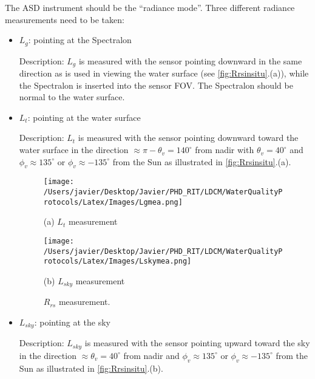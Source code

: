 \begin{appendices}
The ASD instrument should be the ``radiance mode''. Three different radiance measurements need to be taken:
\begin{itemize}[itemsep=2pt,parsep=2pt]
	\item $L_g$: pointing at the Spectralon

Description: $L_g$ is measured with the sensor pointing downward in the same direction as is used in viewing the water surface (see \autoref{fig:Rrsinsitu}.(a)), while the Spectralon is inserted into the sensor FOV. The Spectralon should be normal to the water surface.

	\item $L_t$: pointing at the water surface

Description: $L_t$ is measured with the sensor pointing downward toward the water surface in the direction $\approx \pi-\theta_v = 140^\circ$ from nadir with $\theta_v = 40^\circ$ and $\phi_v \approx 135^\circ$ or $\phi_v \approx -135^\circ$ from the Sun as illustrated in \autoref{fig:Rrsinsitu}.(a).

\begin{figure}[htb]
\begin{minipage}[c]{1.0\linewidth}
\centering
    \texttt{[image: /Users/javier/Desktop/Javier/PHD\_RIT/LDCM/WaterQualityProtocols/Latex/Images/Lgmea.png]}
    \centerline{(a) $L_t$ measurement}\medskip
\end{minipage}  
\hfill 
\begin{minipage}[d]{1.0\linewidth}
\centering
    \texttt{[image: /Users/javier/Desktop/Javier/PHD\_RIT/LDCM/WaterQualityProtocols/Latex/Images/Lskymea.png]}
    \centerline{(b) $L_{sky}$ measurement}\medskip
\end{minipage}    
   \caption[Rrs {\it in situ} measurement]{\label{fig:Rrsinsitu} $R_{rs}$ measurement.}
\end{figure}

	\item $L_{sky}$: pointing at the sky

Description: $L_{sky}$ is measured with the sensor pointing upward toward the sky in the direction $\approx \theta_v = 40^\circ$ from nadir and $\phi_v \approx 135^\circ$ or $\phi_v \approx -135^\circ$ from the Sun as illustrated in \autoref{fig:Rrsinsitu}.(b).




\end{itemize}
\end{appendices}
